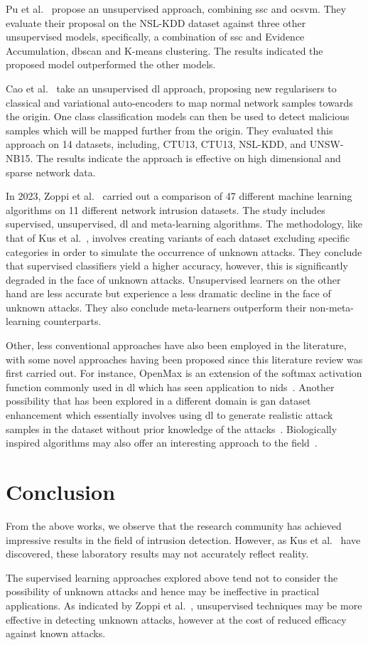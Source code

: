 Pu et al.~\cite{Pu} propose an unsupervised approach, combining \gls{ssc} and
\gls{ocsvm}. They evaluate their proposal on the NSL-KDD dataset against three
other unsupervised models, specifically, a combination of \gls{ssc} and
Evidence Accumulation, \gls{dbscan} and K-means clustering. The results
indicated the proposed model outperformed the other models.

Cao et al.~\cite{Cao} take an unsupervised \gls{dl} approach, proposing new
regularisers to classical and variational auto-encoders to map normal network
samples towards the origin. One class classification models can then be used to
detect malicious samples which will be mapped further from the origin. They
evaluated this approach on 14 datasets, including, CTU13, CTU13,
NSL-KDD, and UNSW-NB15. The results indicate the approach is effective on high
dimensional and sparse network data.

In 2023, Zoppi et al.~\cite{Zoppi} carried out a comparison of 47 different
machine learning algorithms on 11 different network intrusion datasets. The
study includes supervised, unsupervised, \gls{dl} and meta-learning algorithms.
The methodology, like that of Kus et al.~\cite{Kus}, involves creating variants
of each dataset excluding specific categories in order to simulate the
occurrence of unknown attacks. They conclude that supervised classifiers yield
a higher accuracy, however, this is significantly degraded in the face of
unknown attacks. Unsupervised learners on the other hand are less accurate but
experience a less dramatic decline in the face of unknown attacks. They also
conclude meta-learners outperform their non-meta-learning counterparts.

Other, less conventional approaches have also been employed in the literature,
with some novel approaches having been proposed since this literature review
was first carried out. For instance, OpenMax is an extension of the softmax
activation function commonly used in \gls{dl} which has seen application to
\gls{nids}~\cite{openmax}. Another possibility that has been explored in a
different domain is \gls{gan} dataset enhancement which essentially involves
using \gls{dl} to generate realistic attack samples in the dataset without
prior knowledge of the attacks~\cite{gan_enhancement}. Biologically inspired
algorithms may also offer an interesting approach to the field~\cite{AIm}.

\section{Conclusion}%
\label{sec:conclusion2}
From the above works, we observe that the research community has achieved
impressive results in the field of intrusion detection. However, as Kus et
al.~\cite{Kus} have discovered, these laboratory results may not accurately
reflect reality.

The supervised learning approaches explored above tend not to consider the
possibility of unknown attacks and hence may be ineffective in practical
applications. As indicated by Zoppi et al.~\cite{Zoppi}, unsupervised
techniques may be more effective in detecting unknown attacks, however at the
cost of reduced efficacy against known attacks.
